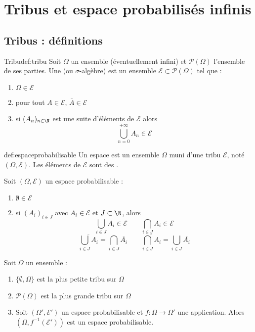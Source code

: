 \section{Tribus et espace probabilisés infinis}
\subsection{Tribus : définitions}


\begin{definition}{Tribu}{def:tribu}
	Soit $\Omega$ un ensemble (éventuellement infini) et $\mathcal{P}(\Omega)$ l'ensemble de ses parties. Une  (ou $\sigma$-algèbre) est un ensemble $\mathcal{E} \subset \mathcal{P}(\Omega)$ tel que :
	\begin{enumerate}
      \item $\Omega \in \mathcal{E}$
      \item pour tout $A \in \mathcal{E}$, $\overline{A} \in \mathcal{E}$
      \item si $(A_n)_{n \in \N}$ est une suite d'éléments de $\mathcal{E}$ alors $$\bigcup_{n=0}^{+\infty} A_n \in \mathcal{E}$$
	\end{enumerate}
\end{definition}

\begin{definition}{}{def:espaceprobabilisable}
	Un espace  est un ensemble $\Omega$ muni d'une tribu $\mathcal{E}$, noté $(\Omega,\mathcal{E})$. Les éléments de $\mathcal{E}$ sont des .
\end{definition}

\begin{proposition}{}{}
	Soit $(\Omega,\mathcal{E})$ un espace probabilisable :
	\begin{enumerate}
       \item $\emptyset \in \mathcal{E}$
       \item si $(A_i)_{i \in J}$ avec $A_i \in  \mathcal{E}$ et $J \subset \N$, alors 
       $$\bigcup_{i \in J} A_i \in  \mathcal{E} \qquad \bigcap_{i \in J} A_i \in  \mathcal{E}$$
        $$\overline{\bigcup_{i \in J} A_i} = \bigcap_{i \in J} \overline{A_i} \qquad \overline{\bigcap_{i \in J} A_i} = \bigcup_{i \in J} \overline{A_i} $$
 	\end{enumerate}
\end{proposition}

\begin{exemple}{}{}
	Soit $\Omega$ un ensemble :
	\begin{enumerate}
		\item $\{\emptyset,\Omega\}$ est la plus petite tribu sur $\Omega$
		\item $\mathcal{P}(\Omega)$ est la plus grande tribu sur $\Omega$
		\item Soit $(\Omega',\mathcal{E}')$ un espace probabilisable et $f \colon \Omega \to \Omega'$ une application. Alors $(\Omega,f^{-1}(\mathcal{E}'))$ est un espace probabilisable.
	\end{enumerate}
\end{exemple}



